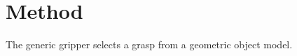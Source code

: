 \section{Method}
\label{sec:shared}
The generic gripper selects a grasp from a geometric object model.

